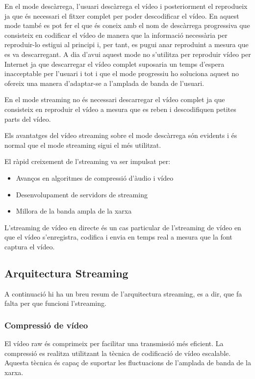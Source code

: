 \documentclass[12pt, titlepage]{article}
\begin{document}
En el mode descàrrega, l’usuari descàrrega el vídeo i
posteriorment el reprodueix ja que és necessari el fitxer complet per poder
descodificar el vídeo. En aquest mode també es pot fer el que és coneix amb el
nom de descàrrega progressiva que consisteix en codificar el vídeo de manera que
la informació necessària per reproduir-lo estigui al principi i, per tant, es
pugui anar reproduint a mesura que es va descarregant. A dia d’avui aquest mode
no s’utilitza per reproduir vídeo per Internet ja que descarregar el vídeo
complet suposaria un temps d’espera inacceptable per l’usuari i tot i que el mode
progressiu ho soluciona aquest no ofereix una manera d’adaptar-se a l'amplada de banda
de l’usuari.

En el mode streaming no és necessari descarregar el vídeo complet
ja que consisteix en reproduir el vídeo a mesura que es reben i descodifiquen
petites parts del vídeo.

Els avantatges del vídeo streaming sobre el mode descàrrega són evidents i és
normal que el mode streaming sigui el més utilitzat.

El ràpid creixement de l’streaming va ser impulsat per:

\begin{itemize}
\item Avanços en algoritmes de compressió d’àudio i vídeo
\item Desenvolupament de servidors de streaming
\item Millora de la banda ampla de la xarxa
\end{itemize}

L’streaming de vídeo en directe és un cas particular de l’streaming de vídeo
en que el vídeo s’enregistra, codifica i envia en temps real a mesura que la font
captura el vídeo.

\subsection{Arquitectura Streaming}

A continuació hi ha un breu resum de l'arquitectura streaming, es a dir, que
fa falta per que funcioni l'streaming.

\subsubsection{Compressió de vídeo}
El vídeo raw és comprimeix per facilitar una transmissió més eficient. La compressió
es realitza utilitzant la tècnica de codificació de vídeo escalable. Aquesta tècnica
és capaç de suportar les fluctuacions de l'amplada de banda de la xarxa.
\end{document}
